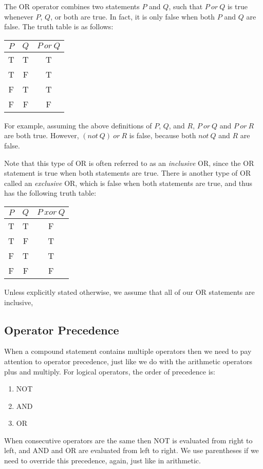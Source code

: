\documentclass[letterpaper,12pt,fleqn]{article}
\begin{document}
The OR operator combines two statements $P$ and $Q$, such that $P\ or\ Q$ is
true whenever $P$, $Q$, or both are true. In fact, it is only false when both
$P$ and $Q$ are false. The truth table is as follows:

\begin{tabular}{|cc|c|}
\hline
$P$ & $Q$ & $P\ or\ Q$ \\
\hline
T & T & T \\
\hline
T & F & T \\
\hline
F & T & T \\
\hline
F & F & F \\
\hline
\end{tabular}

For example, assuming the above definitions of $P$, $Q$, and $R$, $P\ or\ Q$ and
$P\ or\ R$ are both true. However, $(not\ Q)\ or\ R$ is false, because both
$not\ Q$ and $R$ are false.

Note that this type of OR is often referred to as an \emph{inclusive} OR, since
the OR statement is true when both statements are true. There is another type
of OR called an \emph{exclusive} OR, which is false when both statements are
true, and thus has the following truth table:

\begin{tabular}{|cc|c|}
\hline
$P$ & $Q$ & $P\ xor\ Q$ \\
\hline
T & T & F \\
\hline
T & F & T \\
\hline
F & T & T \\
\hline
F & F & F \\
\hline
\end{tabular}

Unless explicitly stated otherwise, we assume that all of our OR statements are
inclusive,

\subsection*{Operator Precedence}

When a compound statement contains multiple operators then we need to pay
attention to operator precedence, just like we do with the arithmetic operators
plus and multiply. For logical operators, the order of precedence is:
\begin{enumerate}
\item{NOT}
\item{AND}
\item{OR}
\end{enumerate}
When consecutive operators are the same then NOT is evaluated from right to
left, and AND and OR are evaluated from left to right. We use parentheses if we
need to override this precedence, again, just like in arithmetic.
\end{document}
